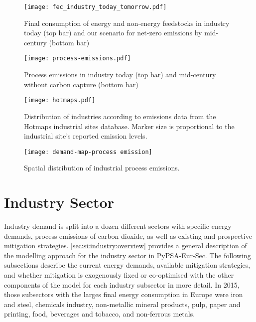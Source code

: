 \begin{SCfigure}
    \texttt{[image: fec\_industry\_today\_tomorrow.pdf]}
    \caption{Final consumption of energy and non-energy feedstocks in industry today (top bar) and
    our scenario for net-zero emissions by mid-century (bottom bar)}
    \label{fig:fec-industry}
\end{SCfigure}

\begin{SCfigure}
    \texttt{[image: process-emissions.pdf]}
    \caption{Process emissions in industry today (top bar) and mid-century without carbon capture (bottom bar)}
    \label{fig:process-emissions}
\end{SCfigure}


\begin{SCfigure}
    \texttt{[image: hotmaps.pdf]}
    \caption{Distribution of industries according to emissions data from the Hotmaps industrial sites database. Marker size is proportional to the industrial site's reported emission levels.}
    \label{fig:hotmaps}
\end{SCfigure}

\begin{SCfigure}
    \texttt{[image: demand-map-process emission]}
    \caption{Spatial distribution of industrial process emissions.}
    \label{fig:spatial-process-emissions}
\end{SCfigure}

\section{Industry Sector}
\label{sec:si:industry}

Industry demand is split into a dozen different sectors with specific energy
demands, process emissions of carbon dioxide, as well as existing and
prospective mitigation strategies. \cref{sec:si:industry:overview} provides a
general description of the modelling approach for the industry sector in
PyPSA-Eur-Sec. The following subsections describe the current energy demands,
available mitigation strategies, and whether mitigation is exogenously fixed or
co-optimised with the other components of the model for each industry subsector
in more detail. In 2015, those subsectors with the larges final energy
consumption in Europe were iron and steel, chemicals industry, non-metallic
mineral products, pulp, paper and printing, food, beverages and tobacco, and
non-ferrous metals.

